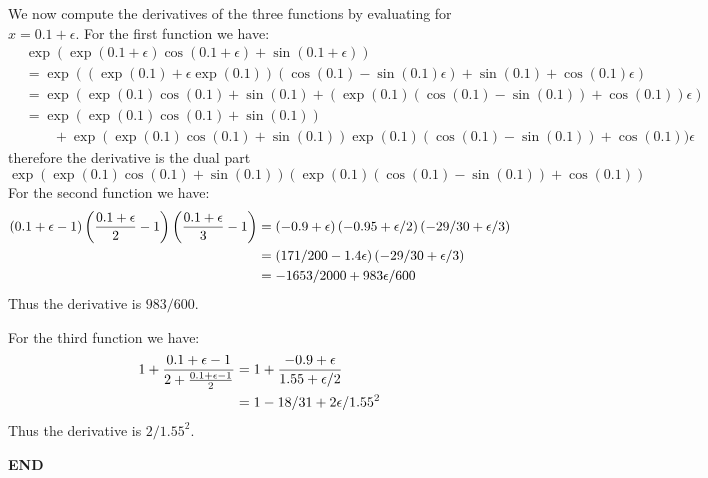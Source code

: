 \documentclass[12pt,a4paper]{article}
\begin{document}
We now compute the derivatives of the three functions by evaluating for $x = 0.1 + \ensuremath{\epsilon}$. For the first function we have:
\begin{align*}
&\exp(\exp(0.1 + \ensuremath{\epsilon})\cos(0.1+\ensuremath{\epsilon}) + \sin(0.1+\ensuremath{\epsilon})) \\
&=\exp((\exp(0.1) + \ensuremath{\epsilon}\exp(0.1))(\cos(0.1)-\sin(0.1)\ensuremath{\epsilon}) + \sin(0.1)+\cos(0.1)\ensuremath{\epsilon}) \\
&= \exp(\exp(0.1)\cos(0.1)+ \sin(0.1) + (\exp(0.1)(\cos(0.1)-\sin(0.1))+\cos(0.1))\ensuremath{\epsilon}) \\
&= \exp(\exp(0.1)\cos(0.1)+ \sin(0.1))\\
&\qquad + \exp(\exp(0.1)\cos(0.1)+ \sin(0.1))\exp(0.1)(\cos(0.1)-\sin(0.1))+\cos(0.1))\ensuremath{\epsilon} 
\end{align*}
therefore the derivative is the dual part
\[
\exp(\exp(0.1)\cos(0.1)+ \sin(0.1))(\exp(0.1)(\cos(0.1)-\sin(0.1))+\cos(0.1))
\]
For the second function we have:
\begin{align*}
 \left(0.1+\ensuremath{\epsilon}-1\right) \left({0.1 + \ensuremath{\epsilon} \over 2}-1\right)\left({0.1 + \ensuremath{\epsilon} \over 3}-1\right)
 &=\left(-0.9+\ensuremath{\epsilon}\right) \left(-0.95 + \ensuremath{\epsilon}/2\right)\left(-29/30 + \ensuremath{\epsilon}/3\right) \\
&=\left(171/200 -1.4\ensuremath{\epsilon}\right)\left(-29/30 + \ensuremath{\epsilon}/3\right)  \\
&= -1653/2000 + 983\ensuremath{\epsilon}/600
\end{align*}
Thus the derivative is $983/600$.

For the third function we have:
\begin{align*}
{1 + {0.1+\ensuremath{\epsilon} - 1 \over 2 + {0.1+\ensuremath{\epsilon}-1 \over 2}}} &=  {1 + {-0.9+\ensuremath{\epsilon} \over 1.55 + \ensuremath{\epsilon}/2}}\\
&= 1 -18/31 + 2\ensuremath{\epsilon}/1.55^2
\end{align*}
Thus the derivative is $2/1.55^2$.

\textbf{END}
\end{document}
